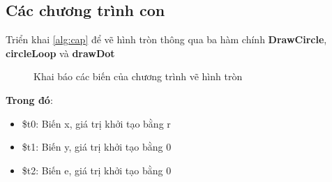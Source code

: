 \documentclass[a4paper,12pt]{article}
\begin{document}
    
    \subsection{Các chương trình con}
    Triển khai \ref{alg:cap} để vẽ hình tròn thông qua ba hàm chính \textbf{DrawCircle},  \textbf{circleLoop} và \textbf{drawDot}
    \FloatBarrier
    \begin{figure}[ht!]
    	\centerline{}
    	\caption{Khai báo các biến của chương trình vẽ hình tròn}
    	\label{fig:bai6}
    \end{figure}
    \noindent
    \textbf{Trong đó}:
    \begin{itemize}
        \item \$t0: Biến x, giá trị khởi tạo bằng r
        \item \$t1: Biến y, giá trị khởi tạo bằng 0
        \item \$t2: Biến e, giá trị khởi tạo bằng 0
    \end{itemize}
    \clearpage
\end{document}
